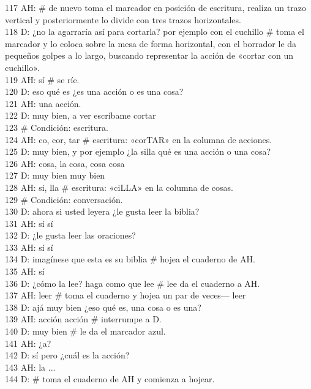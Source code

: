 117 AH: \# de nuevo toma el marcador en posición de escritura, realiza un trazo vertical y posteriormente lo divide con tres trazos horizontales.\\
118 D: ¿no la agarraría así para cortarla? por ejemplo con el cuchillo \# toma el marcador y lo coloca sobre la mesa de forma horizontal, con el borrador le da pequeños golpes a lo largo, buscando representar la acción de «cortar con un cuchillo».\\
119 AH: sí \# se ríe.\\
120 D: eso qué es ¿es una acción o es una cosa?\\
121 AH: una acción.\\
122 D: muy bien, a ver escríbame cortar\\
123 \# Condición: escritura.\\
124 AH: co, cor, tar \# escritura: «corTAR» en la columna de acciones.\\
125 D: muy bien, y por ejemplo ¿la silla qué es una acción o una cosa?\\
126 AH: cosa, la cosa, cosa cosa\\
127 D: muy bien muy bien\\
128 AH: si, lla \# escritura: «ciLLA» en la columna de cosas.\\
129 \# Condición: conversación.\\
130 D: ahora si usted leyera ¿le gusta leer la biblia?\\
131 AH: sí sí\\
132 D: ¿le gusta leer las oraciones?\\
133 AH: sí sí\\
134 D: imagínese que esta es su biblia \# hojea el cuaderno de AH.\\
135 AH: sí\\
136 D: ¿cómo la lee? haga como que lee \# lee da el cuaderno a AH.\\
137 AH: leer \# toma el cuaderno y hojea un par de veces--- leer\\
138 D: ajá muy bien ¿eso qué es, una cosa o es una?\\
139 AH: acción acción \# interrumpe a D.\\
140 D: muy bien \# le da el marcador azul.\\
141 AH: ¿a?\\
142 D: sí pero ¿cuál es la acción?\\
143 AH: la ...\\
144 D: \# toma el cuaderno de AH y comienza a hojear.\\
